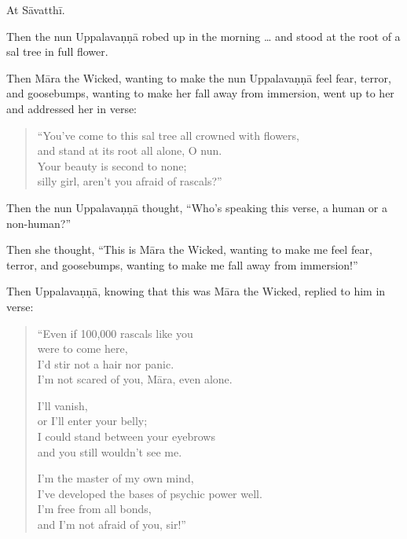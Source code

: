 \documentclass[12pt,openany]{book}%
\begin{document}
At \textsanskrit{Sāvatthī}. 

Then the nun \textsanskrit{Uppalavaṇṇā} robed up in the morning … and stood at the root of a sal tree in full flower. 

Then \textsanskrit{Māra} the Wicked, wanting to make the nun \textsanskrit{Uppalavaṇṇā} feel fear, terror, and goosebumps, wanting to make her fall away from immersion, went up to her and addressed her in verse: 

\begin{verse}%
“You’ve come to this sal tree all crowned with flowers, \\
and stand at its root all alone, O nun. \\
Your beauty is second to none; \\
silly girl, aren’t you afraid of rascals?” 

%
\end{verse}

Then the nun \textsanskrit{Uppalavaṇṇā} thought, “Who’s speaking this verse, a human or a non-human?” 

Then she thought, “This is \textsanskrit{Māra} the Wicked, wanting to make me feel fear, terror, and goosebumps, wanting to make me fall away from immersion!” 

Then \textsanskrit{Uppalavaṇṇā}, knowing that this was \textsanskrit{Māra} the Wicked, replied to him in verse: 

\begin{verse}%
“Even if 100,000 rascals like you \\
were to come here, \\
I’d stir not a hair nor panic. \\
I’m not scared of you, \textsanskrit{Māra}, even alone. 

I’ll vanish, \\
or I’ll enter your belly; \\
I could stand between your eyebrows \\
and you still wouldn’t see me. 

I’m the master of my own mind, \\
I’ve developed the bases of psychic power well. \\
I’m free from all bonds, \\
and I’m not afraid of you, sir!” 

%
\end{verse}
\end{document}
